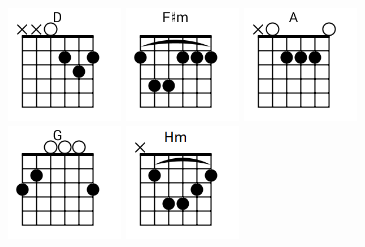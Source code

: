 \begin{figure}[h]
\predtitle\centering
\includegraphics[width=3cm]{../Akordy/d.png}
\includegraphics[width=3cm]{../Akordy/fxm.png}
\includegraphics[width=3cm]{../Akordy/a.png}
\includegraphics[width=3cm]{../Akordy/g.png}
\includegraphics[width=3cm]{../Akordy/hm.png}
\end{figure}
